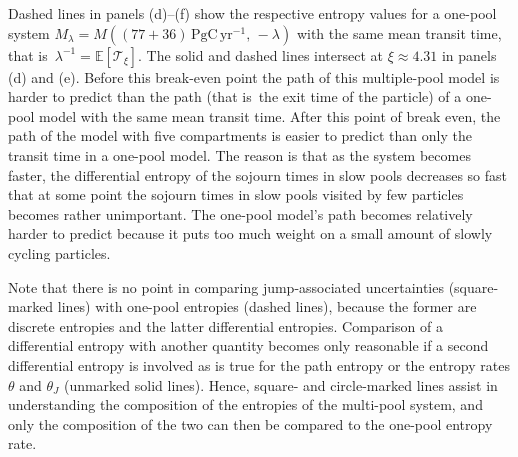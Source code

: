 \documentclass[smallextended]{svjour3}
\newcommand{\E}{\mathbb{E}}
\newcommand{\TT}{\mathcal{T}}
\newcommand{\peta}{\mathrm{P}}
\newcommand{\gC}{\mathrm{gC}}
\newcommand{\yr}{\mathrm{yr}}
\newcommand{\ie}{that is}
\begin{document}
Dashed lines in panels (d)--(f) show the respective entropy values for a one-pool system $M_\lambda=M((77+36)\,\peta\gC\,\yr^{-1},\, -\lambda)$ with the same mean transit time, \ie\ $\lambda^{-1} = \E\left[\TT_\xi\right]$.
The solid and dashed lines intersect at $\xi\approx4.31$ in panels (d) and (e).
Before this break-even point the path of this multiple-pool model is harder to predict than the path (\ie\ the exit time of the particle) of a one-pool model with the same mean transit time.
After this point of break even, the path of the model with five compartments is easier to predict than only the transit time in a one-pool model.
The reason is that as the system becomes faster, the differential entropy of the sojourn times in slow pools decreases so fast that at some point the sojourn times in slow pools visited by few particles becomes rather unimportant.
The one-pool model's path becomes relatively harder to predict because it puts too much weight on a small amount of slowly cycling particles.

Note that there is no point in comparing jump-associated uncertainties (square-marked lines) with one-pool entropies (dashed lines), because the former are discrete entropies and the latter differential entropies.
Comparison of a differential entropy with another quantity becomes only reasonable if a second differential entropy is involved as is true for the path entropy or the entropy rates $\theta$ and $\theta_J$ (unmarked solid lines).
Hence, square- and circle-marked lines assist in understanding the composition of the entropies of the multi-pool system, and only the composition of the two can then be compared to the one-pool entropy rate.
\end{document}
